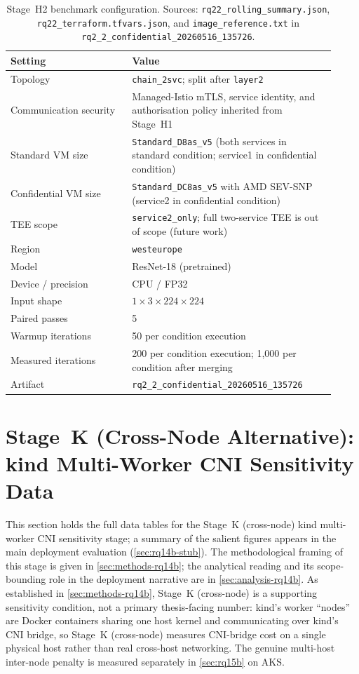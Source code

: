 \begin{table}[ht]
\centering
\caption[Stage~H2 benchmark configuration]{Stage~H2 benchmark configuration. Sources: \texttt{rq22\_rolling\_summary.json}, \texttt{rq22\_terraform.tfvars.json}, and \texttt{image\_reference.txt} in \texttt{rq2\_2\_confidential\_20260516\_135726}.}
\label{tab:rq22_config}
\begin{tabular}{p{0.34\linewidth}p{0.58\linewidth}}
\toprule
\textbf{Setting} & \textbf{Value} \\
\midrule
Topology & \texttt{chain\_2svc}; split after \texttt{layer2} \\
Communication security & Managed-Istio mTLS, service identity, and authorisation policy inherited from Stage~H1 \\
Standard VM size & \texttt{Standard\_D8as\_v5} (both services in standard condition; service1 in confidential condition) \\
Confidential VM size & \texttt{Standard\_DC8as\_v5} with AMD SEV-SNP (service2 in confidential condition) \\
TEE scope & \texttt{service2\_only}; full two-service TEE is out of scope (future work) \\
Region & \texttt{westeurope} \\
Model & ResNet-18 (pretrained) \\
Device / precision & CPU / FP32 \\
Input shape & $1 \times 3 \times 224 \times 224$ \\
Paired passes & 5 \\
Warmup iterations & 50 per condition execution \\
Measured iterations & 200 per condition execution; 1,000 per condition after merging \\
Artifact & \texttt{rq2\_2\_confidential\_20260516\_135726} \\
\bottomrule
\end{tabular}
\end{table}

\clearpage

\section{Stage~K (Cross-Node Alternative): kind Multi-Worker CNI Sensitivity Data}
\label{sec:appendix-rq14b}

This section holds the full data tables for the Stage~K (cross-node) kind
multi-worker CNI sensitivity stage; a summary of the salient figures appears in
the main deployment evaluation (\cref{sec:rq14b-stub}). The methodological framing of this
stage is given in \cref{sec:methods-rq14b}; the analytical reading and
its scope-bounding role in the deployment narrative are in
\cref{sec:analysis-rq14b}. As established in \cref{sec:methods-rq14b},
Stage~K (cross-node) is a supporting sensitivity condition, not a
primary thesis-facing number: kind's worker ``nodes'' are Docker
containers sharing one host kernel and communicating over kind's CNI
bridge, so Stage~K (cross-node) measures CNI-bridge cost on a single physical host
rather than real cross-host networking. The genuine multi-host
inter-node penalty is measured separately in \cref{sec:rq15b} on AKS.

